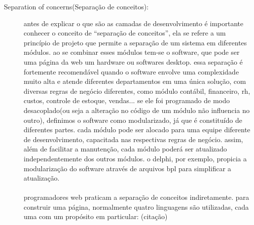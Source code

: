	\begin{description} 
		\item[Separation of concerns(Separação de conceitos):]
			antes de explicar o que são as camadas de desenvolvimento é importante conhecer o conceito de “separação de conceitos”, ela se refere a um princípio de projeto que permite a separação de um sistema em diferentes módulos. ao se combinar esses módulos tem-se o software, que pode ser uma página da web um hardware ou softwares desktop. essa separação é fortemente recomendável quando o software envolve uma complexidade muito alta e atende diferentes departamentos em uma única solução, com diversas regras de negócio diferentes, como módulo contábil, financeiro, rh, custos, controle de estoque, vendas... se ele foi programado de modo desacoplado(ou seja a alteração no código de um módulo não influencia no outro), definimos o software como modularizado, já que é constituído de diferentes partes. cada módulo pode ser alocado para uma equipe diferente de desenvolvimento, capacitada nas respectivas regras de negócio. assim, além de facilitar a manutenção, cada módulo poderá ser atualizado independentemente dos outros módulos. o delphi, por exemplo, propicia a modularização do software através de arquivos bpl para simplificar a atualização. \cite{SeparationOfConcerns}\\\\	
			programadores web praticam a separação de conceitos indiretamente. para construir uma página, normalmente quatro linguagens são utilizadas, cada uma com um propósito em particular: (citação) 
			
			\begin{description}
				\setlength\itemindent{15pt}
				\item[•] {HTML}
				\item[•] {CSS}
				\item[•] {JAVASCRIPT}
				\item[•] {BACKEND(PHYTON)}
			\end{description}
				

\end{description}
